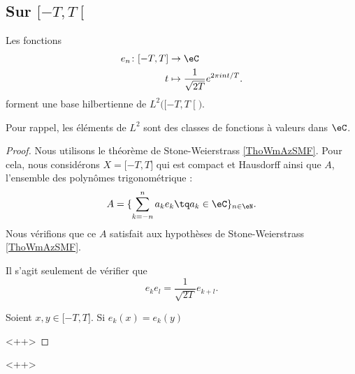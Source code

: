\subsection{Sur \( \mathopen[ -T , T \mathclose[\)}

\begin{proposition}
    Les fonctions    
    \begin{equation}
        \begin{aligned}
            e_n\colon \mathopen[ -T , T \mathclose]&\to \eC \\
            t&\mapsto \frac{1}{ \sqrt{ 2T } } e^{2\pi int/T}. 
        \end{aligned}
    \end{equation}
    forment une base hilbertienne de \( L^2\big( \mathopen[ -T , T \mathclose[ \big)\).
\end{proposition}

Pour rappel, les éléments de \( L^2\) sont des classes de fonctions à valeurs dans \( \eC\).

\begin{proof}
    Nous utilisons le théorème de Stone-Weierstrass \ref{ThoWmAzSMF}. Pour cela, nous considérons \( X=\mathopen[ -T , T \mathclose]\) qui est compact et Hausdorff ainsi que \( A\), l'ensemble des polynômes trigonométrique :
    \begin{equation}
        A=\{ \sum_{k=-n}^na_ke_k\tq a_k\in \eC \}_{n\in \eN}.
    \end{equation}
    Nous vérifions que ce \( A\) satisfait aux hypothèses de Stone-Weierstrass \ref{ThoWmAzSMF}.
    \begin{subproof}
        \item[\( A\) est une algèbre]
            Il s'agit seulement de vérifier que
            \begin{equation}
                e_ke_l=\frac{1}{ \sqrt{ 2T } }e_{k+l}.
            \end{equation}
        \item[\( A\) sépare les points]
            Soient \( x,y\in \mathopen[ -T , T \mathclose]\). Si \( e_k(x)=e_k(y)\)
    \end{subproof}
    <++>
\end{proof}
<++>

